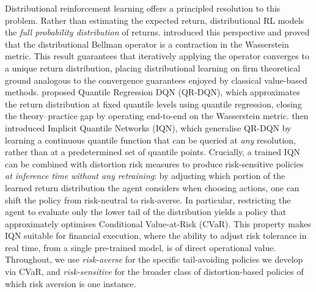\documentclass[11pt]{article}
\begin{document}
Distributional reinforcement learning offers a principled resolution to this problem. Rather than estimating the expected return, distributional RL models the \emph{full probability distribution} of returns. \citet{bellemare2017distributional} introduced this perspective and proved that the distributional Bellman operator is a contraction in the Wasserstein metric. This result guarantees that iteratively applying the operator converges to a unique return distribution, placing distributional learning on firm theoretical ground analogous to the convergence guarantees enjoyed by classical value-based methods. \citet{dabney2018quantile} proposed Quantile Regression DQN (QR-DQN), which approximates the return distribution at fixed quantile levels using quantile regression, closing the theory--practice gap by operating end-to-end on the Wasserstein metric. \citet{dabney2018implicit} then introduced Implicit Quantile Networks (IQN), which generalise QR-DQN by learning a continuous quantile function that can be queried at \emph{any} resolution, rather than at a predetermined set of quantile points. Crucially, a trained IQN can be combined with distortion risk measures \citet{wang2000class} to produce risk-sensitive policies \emph{at inference time without any retraining}: by adjusting which portion of the learned return distribution the agent considers when choosing actions, one can shift the policy from risk-neutral to risk-averse. In particular, restricting the agent to evaluate only the lower tail of the distribution yields a policy that approximately optimises Conditional Value-at-Risk (CVaR). This property makes IQN suitable for financial execution, where the ability to adjust risk tolerance in real time, from a single pre-trained model, is of direct operational value. Throughout, we use \emph{risk-averse} for the specific tail-avoiding policies we develop via CVaR, and \emph{risk-sensitive} for the broader class of distortion-based policies of which risk aversion is one instance.
 
\end{document}
